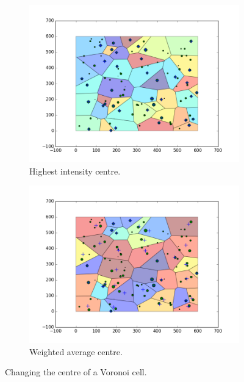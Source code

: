 \begin{figure}
\begin{subfigure}[b]{0.5\textwidth}
  \includegraphics[width=\textwidth]{Images/recentre1.png}
  \caption{Highest intensity centre.}
  \label{fig:recen1}
\end{subfigure}
\hfill
\begin{subfigure}[b]{0.5\textwidth}
  \includegraphics[width=\textwidth]{Images/recentre2.png}
  \caption{Weighted average centre.}
  \label{fig:recen2}
\end{subfigure}
\caption{Changing the centre of a Voronoi cell.}
\label{fig:recentre}
\end{figure}